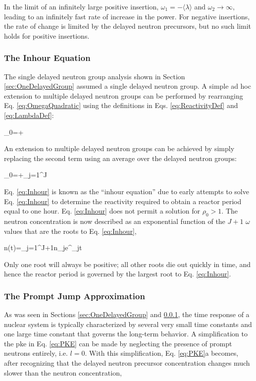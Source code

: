 In the limit of an infinitely large positive insertion, \(\omega_1=-\langle\lambda\rangle\) and \(\omega_2\rightarrow\infty\), leading to an infinitely fast rate of increase in the power. For negative insertions, the rate of change is limited by the delayed neutron precursors, but no such limit holds for positive insertions.

\subsubsection{The Inhour Equation}
\label{sec:Inhour}

The single delayed neutron group analysis shown in Section \ref{sec:OneDelayedGroup} assumed a single delayed neutron group. A simple ad hoc extension to multiple delayed neutron groups can be performed by rearranging Eq. \eqref{eq:OmegaQuadratic} using the definitions in Eqs. \eqref{eq:ReactivityDef} and \eqref{eq:LambdaDef}:

\beq
\rho_0=+
\eeq

An extension to multiple delayed neutron groups can be achieved by simply replacing the second term using an average over the delayed neutron groups:

\beq
\label{eq:Inhour}
\rho_0=+\sum_{j=1}^J
\eeq

Eq. \eqref{eq:Inhour} is known as the ``inhour equation'' due to early attempts to solve Eq. \eqref{eq:Inhour} to determine the reactivity required to obtain a reactor period equal to one hour. Eq. \eqref{eq:Inhour} does not permit a solution for \(\rho_0>1\). The neutron concentration is now described as an exponential function of the \(J+1\) \(\omega\) values that are the roots to Eq. \eqref{eq:Inhour},

\beq
n(t)=\sum_{j=1}^{J+1}n_je^{\omega_jt}
\eeq

Only one root will always be positive; all other roots die out quickly in time, and hence the reactor period is governed by the largest root to Eq. \eqref{eq:Inhour}.

\subsubsection{The Prompt Jump Approximation}

As was seen in Sections \ref{sec:OneDelayedGroup} and \ref{sec:Inhour}, the time response of a nuclear system is typically characterized by several very small time constants and one large time constant that governs the long-term behavior. A simplification to the \gls{pke} in Eq. \eqref{eq:PKE} can be made by neglecting the presence of prompt neutrons entirely, i.e. \(l=0\). With this simplification, Eq. \eqref{eq:PKE}a becomes, after recognizing that the delayed neutron precursor concentration changes much slower than the neutron concentration,

